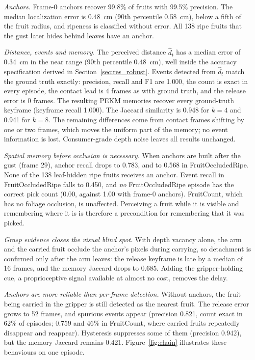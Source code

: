 \emph{Anchors.} Frame-0 anchors recover 99.8\% of fruits with 99.5\% precision. The median localization error is 0.48~cm (90th percentile 0.58~cm), below a fifth of the fruit radius, and ripeness is classified without error. All 138 ripe fruits that the gust later hides behind leaves have an anchor.

\emph{Distance, events and memory.} The perceived distance $\hat d_t$ has a median error of 0.34~cm in the near range (90th percentile 0.48~cm), well inside the accuracy specification derived in Section~\ref{sec:res_robust}. Events detected from $\hat d_t$ match the ground truth exactly: precision, recall and F1 are 1.000, the count is exact in every episode, the contact lead is 4 frames as with ground truth, and the release error is 0 frames. The resulting PEKM memories recover every ground-truth keyframe (keyframe recall 1.000). The Jaccard similarity is 0.948 for $k=4$ and 0.941 for $k=8$. The remaining differences come from contact frames shifting by one or two frames, which moves the uniform part of the memory; no event information is lost. Consumer-grade depth noise leaves all results unchanged.

\emph{Spatial memory before occlusion is necessary.} When anchors are built after the gust (frame 29), anchor recall drops to 0.783, and to 0.568 in FruitOccludedRipe. None of the 138 leaf-hidden ripe fruits receives an anchor. Event recall in FruitOccludedRipe falls to 0.450, and \emph{no} FruitOccludedRipe episode has the correct pick count (0.00, against 1.00 with frame-0 anchors). FruitCount, which has no foliage occlusion, is unaffected. Perceiving a fruit while it is visible and remembering where it is is therefore a precondition for remembering that it was picked.

\emph{Grasp evidence closes the visual blind spot.} With depth vacancy alone, the arm and the carried fruit occlude the anchor's pixels during carrying, so detachment is confirmed only after the arm leaves: the release keyframe is late by a median of 16 frames, and the memory Jaccard drops to 0.685. Adding the gripper-holding cue, a proprioceptive signal available at almost no cost, removes the delay.

\emph{Anchors are more reliable than per-frame detection.} Without anchors, the fruit being carried in the gripper is still detected as the nearest fruit. The release error grows to 52 frames, and spurious events appear (precision 0.821, count exact in 62\% of episodes; 0.759 and 46\% in FruitCount, where carried fruits repeatedly disappear and reappear). Hysteresis suppresses some of them (precision 0.942), but the memory Jaccard remains 0.421. Figure~\ref{fig:chain} illustrates these behaviours on one episode.

